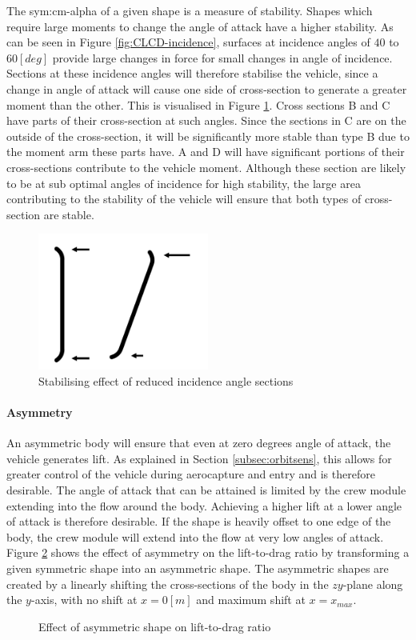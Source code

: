 The \gls{sym:cm-alpha} of a given shape is a measure of stability. Shapes which require large moments to change the angle of attack have a higher stability. As can be seen in Figure \ref{fig:CLCD-incidence}, surfaces at incidence angles of $40$ to $60 \left[deg\right]$ provide large changes in force for small changes in angle of incidence. Sections at these incidence angles will therefore stabilise the vehicle, since a change in angle of attack will cause one side of cross-section to generate a greater moment than the other. This is visualised in Figure \ref{fig:StabMom}. Cross sections B and C have parts of their cross-section at such angles. Since the sections in C are on the outside of the cross-section, it will be significantly more stable than type B due to the moment arm these parts have. A and D will have significant portions of their cross-sections contribute to the vehicle moment. Although these section are likely to be at sub optimal angles of incidence for high stability, the large area contributing to the stability of the vehicle will ensure that both types of cross-section are stable. 


\begin{figure}[h]
	\centering
	\includegraphics[width=0.5\textwidth]{./Figure/Aerodynamics/StabilizeMoment.pdf}
	\caption{Stabilising effect of reduced incidence angle sections}
	\label{fig:StabMom}
\end{figure}

\paragraph{Asymmetry}
An asymmetric body will ensure that even at zero degrees angle of attack, the vehicle generates lift. As explained in Section \ref{subsec:orbitsens}, this allows for greater control of the vehicle during aerocapture and entry and is therefore desirable. The angle of attack that can be attained is limited by the crew module extending into the flow around the body. Achieving a higher lift at a lower angle of attack is therefore desirable. If the shape is heavily offset to one edge of the body, the crew module will extend into the flow at very low angles of attack. Figure \ref{fig:LDSkew} shows the effect of asymmetry on the lift-to-drag ratio by transforming a given symmetric shape into an asymmetric shape. The asymmetric shapes are created by a linearly shifting the cross-sections of the body in the $zy$-plane along the $y$-axis, with no shift at $x=0\left[m\right]$ and maximum shift at $x=x_{max}$. 

\begin{figure}[h]
	\hspace{-8mm}
	\setlength{} 
	\setlength{}
	
	\caption{Effect of asymmetric shape on lift-to-drag ratio}
	\label{fig:LDSkew}
\end{figure}
